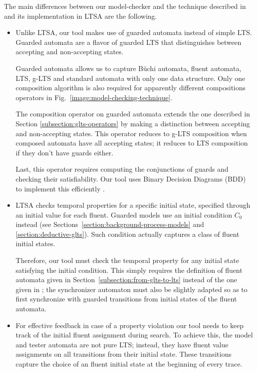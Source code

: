 The main differences between our model-checker and the technique described in \cite{Giannakopoulou:2003} and its implementation in LTSA are the following.
\begin{itemize}

\item Unlike LTSA, our tool makes use of guarded automata instead of simple LTS. Guarded automata are a flavor of guarded LTS that distinguishes between accepting and non-accepting states. 

Guarded automata allows us to capture B\"uchi automata, fluent automata, LTS, g-LTS and standard automata with only one data structure. Only one composition algorithm is also required for apparently different compositions operators in Fig.~\ref{image:model-checking-technique}. 

The composition operator on guarded automata extends the one described in Section \ref{subsection:glts-operators} by making a distinction between accepting and non-accepting states. This operator reduces to g-LTS composition when composed automata have all accepting states; it reduces to LTS composition if they don't have guards either. 

Last, this operator requires computing the conjunctions of guards and checking their satisfiability. Our tool uses Binary Decision Diagrams (BDD) to implement this efficiently \cite{Bryant:1986}. 

\item LTSA checks temporal properties for a specific initial state, specified through an initial value for each fluent. Guarded models use an initial condition $C_0$ instead (see Sections~\ref{section:background-process-models} and \ref{section:deductive-glts}). Such condition actually captures a class of fluent initial states. 

Therefore, our tool must check the temporal property for any initial state satisfying the initial condition. This simply requires the definition of fluent automata given in Section~\ref{subsection:from-glts-to-lts} instead of the one given in \cite{Giannakopoulou:2003}; the synchronizer automaton must also be slightly adapted so as to first synchronize with guarded transitions from initial states of the fluent automata.

\item For effective feedback in case of a property violation our tool needs to keep track of the initial fluent assignment during search. To achieve this, the model and tester automata are not pure LTS; instead, they have fluent value assignments on all transitions from their initial state. These transitions capture the choice of an fluent initial state at the beginning of every trace. 


\end{itemize}
